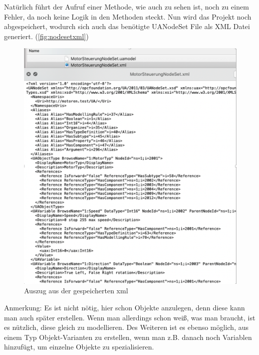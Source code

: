 Natürlich führt der Aufruf einer Methode, wie auch zu sehen ist, noch zu einem Fehler, da noch keine Logik in den Methoden steckt.
Nun wird das Projekt noch abgespeichert, wodurch sich auch das benötigte UANodeSet File als XML Datei generiert.
(\autoref{fig:nodesetxml})
\begin{figure}[H]
	\centering
	\includegraphics[width=0.8\linewidth]{abb/NodesetXML}
	\caption{Auszug aus der gespeicherten xml}
	\label{fig:nodesetxml}
\end{figure}

Anmerkung: Es ist nicht nötig, hier schon Objekte anzulegen, denn diese kann man auch später erstellen. Wenn man allerdings schon weiß, was man braucht, ist es nützlich, diese gleich zu modellieren. Des Weiteren ist es ebenso möglich, aus einem Typ Objekt-Varianten zu erstellen, wenn man z.B. danach noch Variablen hinzufügt, um einzelne Objekte zu spezialisieren.

\clearpage
